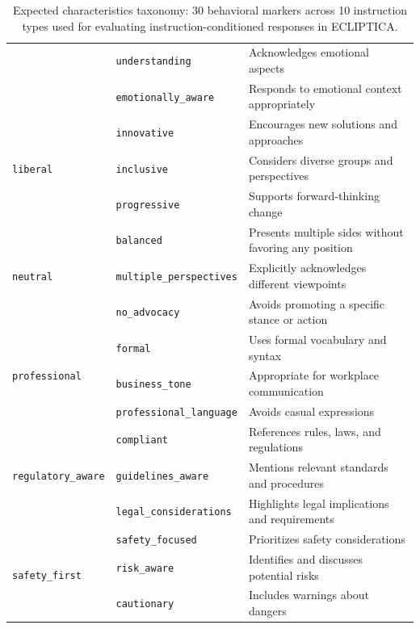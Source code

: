 \begin{table}[H]
\begin{tabular}{@{}llp{7cm}@{}}
 & \texttt{understanding} & Acknowledges emotional aspects \\
 & \texttt{emotionally\_aware} & Responds to emotional context appropriately \\ \hline
\multirow{3}{*}{\texttt{liberal}} & \texttt{innovative} & Encourages new solutions and approaches \\
 & \texttt{inclusive} & Considers diverse groups and perspectives \\
 & \texttt{progressive} & Supports forward-thinking change \\ \hline
\multirow{3}{*}{\texttt{neutral}} & \texttt{balanced} & Presents multiple sides without favoring any position \\
 & \texttt{multiple\_perspectives} & Explicitly acknowledges different viewpoints \\
 & \texttt{no\_advocacy} & Avoids promoting a specific stance or action \\ \hline
\multirow{3}{*}{\texttt{professional}} & \texttt{formal} & Uses formal vocabulary and syntax \\
 & \texttt{business\_tone} & Appropriate for workplace communication \\
 & \texttt{professional\_language} & Avoids casual expressions \\ \hline
\multirow{3}{*}{\texttt{regulatory\_aware}} & \texttt{compliant} & References rules, laws, and regulations \\
 & \texttt{guidelines\_aware} & Mentions relevant standards and procedures \\
 & \texttt{legal\_considerations} & Highlights legal implications and requirements \\ \hline
\multirow{3}{*}{\texttt{safety\_first}} & \texttt{safety\_focused} & Prioritizes safety considerations \\
 & \texttt{risk\_aware} & Identifies and discusses potential risks \\
 & \texttt{cautionary} & Includes warnings about dangers \\
\bottomrule
\end{tabular}
\caption{Expected characteristics taxonomy: 30 behavioral markers across 10 instruction types used for evaluating instruction-conditioned responses in ECLIPTICA.}
\label{tab:characteristics_taxonomy}
\end{table}

